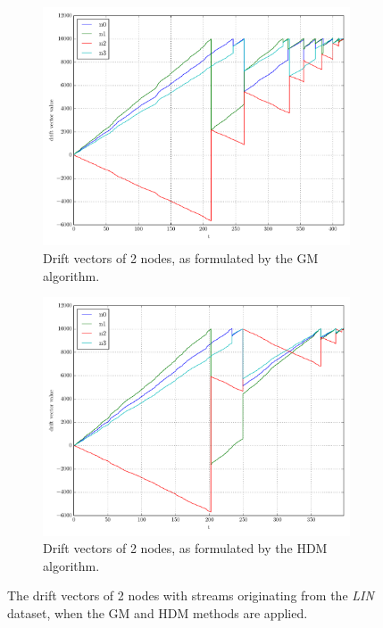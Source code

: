 \begin{figure}[!htb]
\begin{subfigure}{0.49\textwidth}
  \includegraphics[width=\linewidth]{img/main_classic_drifts_linear4N.pdf}
  \caption{Drift vectors of 2 nodes, as formulated by the GM algorithm.}
\end{subfigure}\hfill
\begin{subfigure}{0.49\textwidth}
  \includegraphics[width=\linewidth]{img/main_heuristic_drifts_linear4N.pdf}
  \caption{Drift vectors of 2 nodes, as formulated by the HDM algorithm.}
\end{subfigure}\hfill
\vspace{0.5cm}
\caption{The drift vectors of 2 nodes with streams originating from the \emph{LIN} dataset, when the GM and HDM methods are applied.} \label{fig:mainComp-drifts}
\end{figure}

